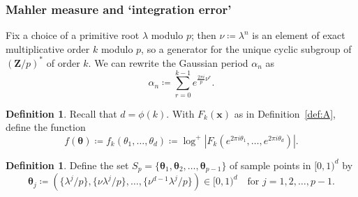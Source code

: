 \documentclass[12pt,reqno]{amsart}
\theoremstyle{definition}
\theoremstyle{plain}
\theoremstyle{definition}
\newtheorem{definition}[theorem]{Definition}
\newcommand{\Z}{\mathbf{Z}}
\newcommand\x{\mathbf{x}}
\newcommand\vtheta{\boldsymbol{\theta}}
\begin{document}
\subsubsection*{Mahler measure and `integration error'} Fix a choice of a primitive root $\lambda$ modulo $p$; then $\nu\coloneqq  \lambda^{n}$ is an element of exact multiplicative order $k$ modulo $p$, so a generator for the unique cyclic subgroup of $(\Z/p)^*$ of order $k$. 
We can rewrite the Gaussian period $\alpha_n$ as  
\begin{equation} 
\label{alphan} 
\alpha_n \coloneqq  \sum_{r=0}^{k- 1} e^{\frac{2 \pi i}{p} \nu^r}. 
\end{equation} 

\begin{definition} 
\label{def-f} 
Recall that $d=\phi(k)$. With $F_k(\x)$ as in  Definition~\ref{def:A}, define the function
\begin{equation*} 
\label{deff} 
f(\vtheta)\coloneqq  f_k(\theta_1,\dots,\theta_{d})\coloneqq  \log^+{|F_k(e^{2 \pi i \theta_1},\dots,e^{2 \pi i \theta_d})|}. \end{equation*}
\end{definition} 

\begin{definition} 
\label{def-sp} 
Define the set $S_p = \{ \vtheta_1, \vtheta_2, \ldots, \vtheta_{p-1}\}$ of sample points in $[0,1)^d$ by 
\begin{equation*}
\vtheta_j\coloneqq (\{\lambda^j/p\},\{\nu \lambda^j/p\},\dots,\{\nu^{d-1} \lambda^j/p\}) \in [0,1)^{d} \quad \text{for } j = 1, 2, \ldots, p-1.
\end{equation*}
\end{definition} 
\end{document}
